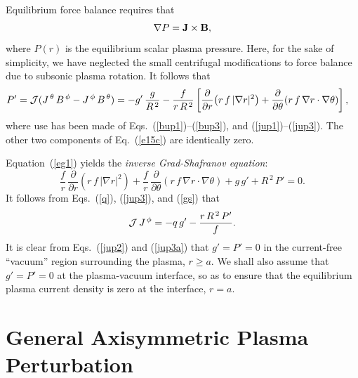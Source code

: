 \documentclass[12pt,prb,aps]{revtex4-1}
\begin{document}
Equilibrium force balance requires that
\begin{equation}\label{e15c}
 \nabla P={\bf J}\times {\bf B},
\end{equation}
where $P(r)$ is the equilibrium scalar plasma pressure. Here, for the sake of simplicity, we have neglected the small centrifugal modifications to force balance due to subsonic plasma
rotation.\cite{flow,flow1}
It follows that 
\begin{align}\label{eg1}
P'&= {\cal J}(J^{\,\theta}\,B^{\,\phi}-J^{\,\phi}\,B^{\,\theta})= -g'\,\frac{g}{R^{\,2}} - \frac{f}{r\,R^{\,2}}\left[\frac{\partial}{\partial r}\!\left(r\,f\,|\nabla r|^2\right)+ \frac{\partial}{\partial\theta}\!\left(r\,f\,\nabla r\cdot\nabla\theta\right)\right],
\end{align}
where use has been made of Eqs.~(\ref{bup1})--(\ref{bup3}), and  (\ref{jup1})--(\ref{jup3}). The
other two components of Eq.~(\ref{e15c}) are identically zero. 

Equation~(\ref{eg1}) yields the {\em inverse Grad-Shafranov equation}:\cite{connor}
\begin{equation}\label{gs}
\frac{f}{r}\,\frac{\partial}{\partial r}\!\left(r\,f\,|\nabla r|^2\right) +\frac{f}{r}\,\frac{\partial}{\partial\theta}\!\left(r\,f\,\nabla r\cdot\nabla\theta\right)+g\,g' + R^{\,2}\,P'=0.
\end{equation}
It follows from Eqs.~(\ref{q}), (\ref{jup3}), and (\ref{gs}) that
\begin{equation}\label{jup3a}
{\cal J}\,J^{\,\phi} = -q\,g' - \frac{r\,R^{\,2}\,P'}{f}.
\end{equation}
It is clear from Eqs.~(\ref{jup2}) and (\ref{jup3a}) that $g'=P'=0$ in the  current-free ``vacuum'' region surrounding the plasma, $r\geq a$. 
We shall also assume that $g'=P'=0$ at the plasma-vacuum interface, so as to ensure that the equilibrium plasma
current density is zero at the interface, $r=a$. 

\section{General Axisymmetric Plasma Perturbation}\label{opde}
\end{document}
